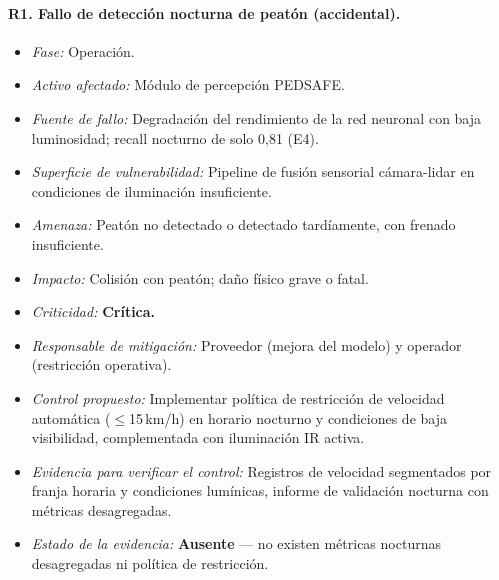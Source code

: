 \documentclass[11pt]{article}
\begin{document}
\paragraph{R1. Fallo de detección nocturna de peatón (accidental).}
\begin{itemize}[nosep]
    \item \textit{Fase:} Operación.
    \item \textit{Activo afectado:} Módulo de percepción PEDSAFE.
    \item \textit{Fuente de fallo:} Degradación del rendimiento de la red neuronal con baja luminosidad; recall nocturno de solo 0,81 (E4).
    \item \textit{Superficie de vulnerabilidad:} Pipeline de fusión sensorial cámara-lidar en condiciones de iluminación insuficiente.
    \item \textit{Amenaza:} Peatón no detectado o detectado tardíamente, con frenado insuficiente.
    \item \textit{Impacto:} Colisión con peatón; daño físico grave o fatal.
    \item \textit{Criticidad:} \textbf{Crítica.}
    \item \textit{Responsable de mitigación:} Proveedor (mejora del modelo) y operador (restricción operativa).
    \item \textit{Control propuesto:} Implementar política de restricción de velocidad automática ($\leq$15\,km/h) en horario nocturno y condiciones de baja visibilidad, complementada con iluminación IR activa.
    \item \textit{Evidencia para verificar el control:} Registros de velocidad segmentados por franja horaria y condiciones lumínicas, informe de validación nocturna con métricas desagregadas.
    \item \textit{Estado de la evidencia:} \textbf{Ausente} --- no existen métricas nocturnas desagregadas ni política de restricción.
\end{itemize}
\end{document}
